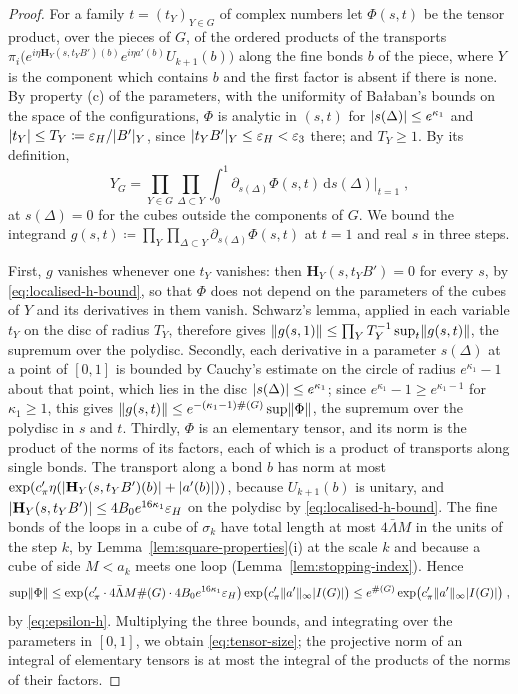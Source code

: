 \documentclass[11pt]{preprint}
\newcommand{\dd}{\mathrm{d}}
\DeclarePairedDelimiter{\abs}{\lvert}{\rvert}
\DeclarePairedDelimiter{\norm}{\lVert}{\rVert}
\numberwithin{equation}{section}
\theoremstyle{definition}
\theoremstyle{remark}
\theoremstyle{plain}
\begin{document}
\begin{proof}
For a family $t = (t_Y)_{Y \in G}$ of complex numbers let $\Phi(s, t)$ be the tensor product, over the pieces of $G$, of the ordered products of the transports $\pi_i\bigl(e^{i\eta\mathbf H_Y(s, t_YB')(b)}e^{i\eta a'(b)}U_{k+1}(b)\bigr)$ along the fine bonds $b$ of the piece, where $Y$ is the component which contains $b$ and the first factor is absent if there is none. By property (c) of the parameters, with the uniformity of Ba{\l}aban's bounds on the space of the configurations, $\Phi$ is analytic in $(s, t)$ for $\abs{s(\Delta)} \leq e^{\kappa_1}$ and $\abs{t_Y} \leq T_Y \coloneqq \varepsilon_H/\abs{B'}_Y$, since $\abs{t_YB'}_Y \leq \varepsilon_H < \varepsilon_3$ there; and $T_Y \geq 1$. By its definition,
\[
    Y_G = \prod_{Y \in G}\prod_{\Delta \subset Y}\int_0^1\partial_{s(\Delta)}\Phi(s, t)\,\dd s(\Delta)\Big|_{t = 1}\;,
\]
at $s(\Delta) = 0$ for the cubes outside the components of $G$. We bound the integrand $g(s, t) \coloneqq \prod_{Y}\prod_{\Delta \subset Y}\partial_{s(\Delta)}\Phi(s, t)$ at $t = 1$ and real $s$ in three steps.

First, $g$ vanishes whenever one $t_Y$ vanishes: then $\mathbf H_Y(s, t_YB') = 0$ for every $s$, by \eqref{eq:localised-h-bound}, so that $\Phi$ does not depend on the parameters of the cubes of $Y$ and its derivatives in them vanish. Schwarz's lemma, applied in each variable $t_Y$ on the disc of radius $T_Y$, therefore gives $\norm{g(s, 1)} \leq \prod_YT_Y^{-1}\sup_t\norm{g(s, t)}$, the supremum over the polydisc. Secondly, each derivative in a parameter $s(\Delta)$ at a point of $[0, 1]$ is bounded by Cauchy's estimate on the circle of radius $e^{\kappa_1} - 1$ about that point, which lies in the disc $\abs{s(\Delta)} \leq e^{\kappa_1}$; since $e^{\kappa_1} - 1 \geq e^{\kappa_1 - 1}$ for $\kappa_1 \geq 1$, this gives $\norm{g(s, t)} \leq e^{-(\kappa_1 - 1)\#(G)}\sup\norm\Phi$, the supremum over the polydisc in $s$ and $t$. Thirdly, $\Phi$ is an elementary tensor, and its norm is the product of the norms of its factors, each of which is a product of transports along single bonds. The transport along a bond $b$ has norm at most $\exp(c'_\pi\eta(\abs{\mathbf H_Y(s, t_YB')(b)} + \abs{a'(b)}))$, because $U_{k+1}(b)$ is unitary, and $\abs{\mathbf H_Y(s, t_YB')} \leq 4B_0e^{16\kappa_1}\varepsilon_H$ on the polydisc by \eqref{eq:localised-h-bound}. The fine bonds of the loops in a cube of $\sigma_k$ have total length at most $4\bar\Lambda M$ in the units of the step $k$, by Lemma~\ref{lem:square-properties}(i) at the scale $k$ and because a cube of side $M < a_k$ meets one loop (Lemma~\ref{lem:stopping-index}). Hence
\[
    \sup\norm\Phi \leq \exp\bigl(c'_\pi \cdot 4\bar\Lambda M\#(G) \cdot 4B_0e^{16\kappa_1}\varepsilon_H\bigr)\exp\bigl(c'_\pi\norm{a'}_\infty\abs{I(G)}\bigr) \leq e^{\#(G)}\exp\bigl(c'_\pi\norm{a'}_\infty\abs{I(G)}\bigr)\;,
\]
by \eqref{eq:epsilon-h}. Multiplying the three bounds, and integrating over the parameters in $[0, 1]$, we obtain \eqref{eq:tensor-size}; the projective norm of an integral of elementary tensors is at most the integral of the products of the norms of their factors.


\end{proof}
\end{document}

